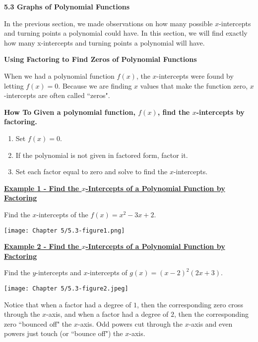 \documentclass[12pt]{book}
\begin{document}
{\Large \textbf{5.3 Graphs of Polynomial Functions}}
\skip

In the previous section, we made observations on how many possible $x$-intercepts and turning points a polynomial could have. In this section, we will find exactly how many x-intercepts and turning points a polynomial will have.
\vspace{2mm}

{\large \textbf{Using Factoring to Find Zeros of Polynomial Functions}}
\vspace{2mm}

When we had a polynomial function $f(x)$, the $x$-intercepts were found by letting $f(x)=0$. Because we are finding $x$ values that make the function zero, $x$-intercepts are often called ``zeros".

\bigskip

\begin{boxR}
\textbf{How To}
    \vspace{1mm}
    \hline
    \vspace{2mm}
\textbf{Given a polynomial function, $f(x)$, find the $x$-intercepts by factoring.}
\begin{enumerate}
    \item Set $f(x)=0$.
    \item If the polynomial is not given in factored form, factor it.
    \item Set each factor equal to zero and solve to find the $x$-intercepts. 
\end{enumerate}
\end{boxR}
\skip

\underline{\textbf{Example 1 - Find the $x$-Intercepts of a Polynomial Function by Factoring}}

Find the $x$-intercepts of the $f(x)=x^2-3x+2$.

\vspace{10mm}

\texttt{[image: Chapter 5/5.3-figure1.png]}


\newpage

\underline{\textbf{Example 2 - Find the $x$-Intercepts of a Polynomial Function by Factoring}}

Find the $y$-intercepts and $x$-intercepts of $g(x)=(x-2)^2(2x+3)$.


\texttt{[image: Chapter 5/5.3-figure2.jpeg]}
\vspace{50mm}

Notice that when a factor had a degree of $1$, then the corresponding zero cross through the $x$-axis, and when a factor had a degree of $2$, then the corresponding zero  ``bounced off" the $x$-axis. Odd powers cut through the $x$-axis and even powers just touch (or ``bounce off") the $x$-axis.
\bigskip
\end{document}
